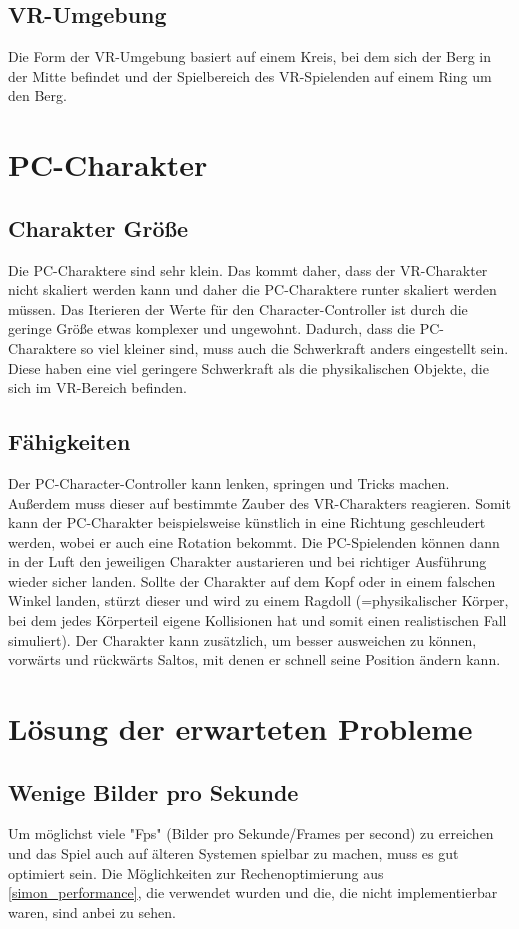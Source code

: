 \subsection{VR-Umgebung}
Die Form der VR-Umgebung basiert auf einem Kreis, bei dem sich der Berg in der Mitte befindet und der Spielbereich des VR-Spielenden auf einem Ring um den Berg.

\section{PC-Charakter}
\subsection{Charakter Größe}
Die PC-Charaktere sind sehr klein. Das kommt daher, dass der VR-Charakter nicht skaliert werden kann und daher die PC-Charaktere runter skaliert werden müssen. Das Iterieren der Werte für den Character-Controller ist durch die geringe Größe etwas komplexer und ungewohnt. Dadurch, dass die PC-Charaktere so viel kleiner sind, muss auch die Schwerkraft anders eingestellt sein. Diese haben eine viel geringere Schwerkraft als die physikalischen Objekte, die sich im VR-Bereich befinden.

\subsection{Fähigkeiten}
Der PC-Character-Controller kann lenken, springen und Tricks machen. Außerdem muss dieser auf bestimmte Zauber des VR-Charakters reagieren. Somit kann der PC-Charakter beispielsweise künstlich in eine Richtung geschleudert werden, wobei er auch eine Rotation bekommt. Die PC-Spielenden können dann in der Luft den jeweiligen Charakter austarieren und bei richtiger Ausführung wieder sicher landen. Sollte der Charakter auf dem Kopf oder in einem falschen Winkel landen, stürzt dieser und wird zu einem Ragdoll (=physikalischer Körper, bei dem jedes Körperteil eigene Kollisionen hat und somit einen realistischen Fall simuliert).
Der Charakter kann zusätzlich, um besser ausweichen zu können, vorwärts und rückwärts Saltos, mit denen er schnell seine Position ändern kann.


\section{Lösung der erwarteten Probleme}\label{simon_problems}

\subsection{Wenige Bilder pro Sekunde}
Um möglichst viele "Fps" (Bilder pro Sekunde/Frames per second) zu erreichen und das Spiel auch auf älteren Systemen spielbar zu machen, muss es gut optimiert sein. Die Möglichkeiten zur Rechenoptimierung aus \ref{simon_performance}, die verwendet wurden und die, die nicht implementierbar waren, sind anbei zu sehen.

